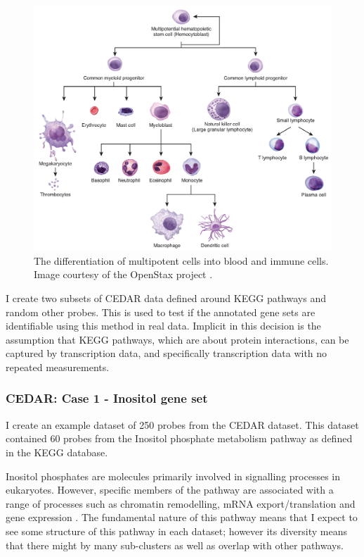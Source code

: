 \documentclass[12pt]{article} %
\begin{document}
	\begin{figure}[h]
		\centering
		\includegraphics[scale=0.75]{Images/white_blood_cell_differentiation.jpg}
		\caption{The differentiation of multipotent cells into blood and immune cells. Image courtesy of the OpenStax project \citep{OpenStaxAnatomyPhysiology2016}.}
		\label{fig:white_blood_cell_differentiation}
	\end{figure}

	 I create two subsets of CEDAR data defined around KEGG pathways and random other probes. This is used to test if the annotated gene sets are identifiable using this method in real data. Implicit in this decision is the assumption that KEGG pathways, which are about protein interactions, can be captured by transcription data, and specifically transcription data with no repeated measurements. 
	 

	 \subsubsection{CEDAR: Case 1 - Inositol gene set} \label{sec:case_studies:cedar:dataset_1}

	I create an example dataset of 250 probes from the CEDAR dataset. This dataset contained 60 probes from the Inositol phosphate metabolism pathway as defined in the KEGG database.
	
	Inositol phosphates are molecules primarily involved in signalling processes in eukaryotes. However, specific members of the pathway are associated with a range of processes such as chromatin remodelling, mRNA export/translation and gene expression \citep{monserrate2010inositol}. The fundamental nature of this pathway means that I expect to see some structure of this pathway in each dataset; however its diversity means that there might by many sub-clusters as well as overlap with other pathways.
	
\end{document}
